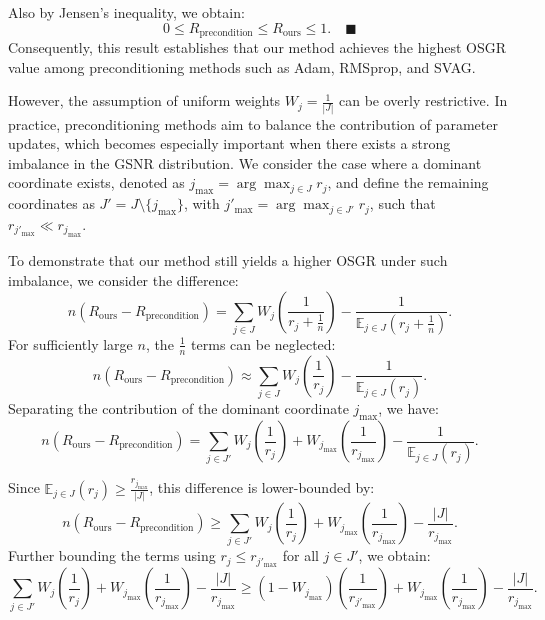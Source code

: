 \documentclass{article}
\theoremstyle{plain}
\theoremstyle{definition}
\theoremstyle{remark}
\begin{document}
Also by Jensen's inequality, we obtain:
\begin{equation}
0 \leq R_{\text{precondition}} \leq R_{\text{ours}} \leq 1.\quad\blacksquare
\end{equation}
Consequently, this result establishes that our method achieves the highest OSGR value among preconditioning methods such as Adam, RMSprop, and SVAG\cite{dissecting}.

However, the assumption of uniform weights \( W_j = \frac{1}{|J|} \) can be overly restrictive. In practice, preconditioning methods aim to balance the contribution of parameter updates, which becomes especially important when there exists a strong imbalance in the GSNR distribution. We consider the case where a dominant coordinate exists, denoted as \( j_{\text{max}} = \arg\max_{j \in J} r_j \), and define the remaining coordinates as \( J' = J \setminus \{j_{\text{max}}\} \), with \( j'_{\text{max}} = \arg\max_{j \in J'} r_j \), such that \( r_{j'_{\text{max}}} \ll r_{j_{\text{max}}} \).

To demonstrate that our method still yields a higher OSGR under such imbalance, we consider the difference:
\begin{equation}
n(R_{\text{ours}} - R_{\text{precondition}}) = \sum_{j \in J} W_j \left(\frac{1}{r_j + \frac{1}{n}}\right) - \frac{1}{\mathbb{E}_{j \in J} \left(r_j + \frac{1}{n} \right)}.
\end{equation}
For sufficiently large \( n \), the \( \frac{1}{n} \) terms can be neglected:
\begin{equation}
n(R_{\text{ours}} - R_{\text{precondition}}) \approx \sum_{j \in J} W_j \left(\frac{1}{r_j}\right) - \frac{1}{\mathbb{E}_{j \in J}(r_j)}.
\end{equation}
Separating the contribution of the dominant coordinate \( j_{\text{max}} \), we have:
\begin{equation}
n(R_{\text{ours}} - R_{\text{precondition}}) = \sum_{j \in J'} W_j \left(\frac{1}{r_j}\right) + W_{j_{\text{max}}} \left(\frac{1}{r_{j_{\text{max}}}}\right) - \frac{1}{\mathbb{E}_{j \in J}(r_j)}.
\end{equation}

Since \( \mathbb{E}_{j \in J}(r_j) \ge \frac{r_{j_{\text{max}}}}{|J|} \), this difference is lower-bounded by:
\begin{equation}
n(R_{\text{ours}} - R_{\text{precondition}}) \ge \sum_{j \in J'} W_j \left(\frac{1}{r_j}\right) + W_{j_{\text{max}}} \left(\frac{1}{r_{j_{\text{max}}}}\right) - \frac{|J|}{r_{j_{\text{max}}}}.
\end{equation}
Further bounding the terms using \( r_j \le r_{j'_{\text{max}}} \) for all \( j \in J' \), we obtain:
\begin{equation}
 \sum_{j \in J'} W_j \left(\frac{1}{r_j}\right) + W_{j_{\text{max}}} \left(\frac{1}{r_{j_{\text{max}}}}\right) - \frac{|J|}{r_{j_{\text{max}}}}\ge \left(1 - W_{j_{\text{max}}}\right) \left(\frac{1}{r_{j'_{\text{max}}}}\right) + W_{j_{\text{max}}} \left(\frac{1}{r_{j_{\text{max}}}}\right) - \frac{|J|}{r_{j_{\text{max}}}}.
\end{equation}
\end{document}
